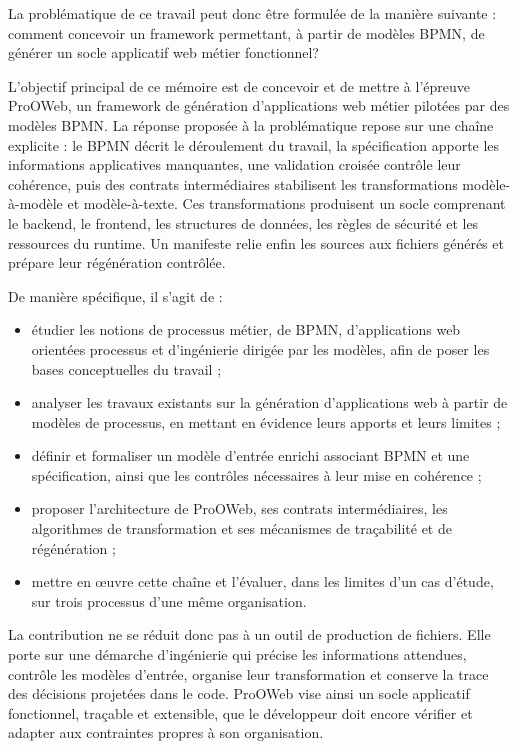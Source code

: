 La problématique de ce travail peut donc être formulée de la manière suivante : comment concevoir un framework permettant, à partir de modèles BPMN, de générer un socle applicatif web métier fonctionnel?

L'objectif principal de ce mémoire est de concevoir et de mettre à l'épreuve ProOWeb, un framework de génération d'applications web métier pilotées par des modèles BPMN. La réponse proposée à la problématique repose sur une chaîne explicite : le BPMN décrit le déroulement du travail, la spécification apporte les informations applicatives manquantes, une validation croisée contrôle leur cohérence, puis des contrats intermédiaires stabilisent les transformations modèle-à-modèle et modèle-à-texte. Ces transformations produisent un socle comprenant le backend, le frontend, les structures de données, les règles de sécurité et les ressources du runtime. Un manifeste relie enfin les sources aux fichiers générés et prépare leur régénération contrôlée.

De manière spécifique, il s'agit de :
\begin{itemize}
    \item étudier les notions de processus métier, de BPMN, d'applications web orientées processus et d'ingénierie dirigée par les modèles, afin de poser les bases conceptuelles du travail ;
    \item analyser les travaux existants sur la génération d'applications web à partir de modèles de processus, en mettant en évidence leurs apports et leurs limites ;
    \item définir et formaliser un modèle d'entrée enrichi associant BPMN et une spécification, ainsi que les contrôles nécessaires à leur mise en cohérence ;
    \item proposer l'architecture de ProOWeb, ses contrats intermédiaires, les algorithmes de transformation et ses mécanismes de traçabilité et de régénération ;
    \item mettre en œuvre cette chaîne et l'évaluer, dans les limites d'un cas d'étude, sur trois processus d'une même organisation.
\end{itemize}

La contribution ne se réduit donc pas à un outil de production de fichiers. Elle porte sur une démarche d'ingénierie qui précise les informations attendues, contrôle les modèles d'entrée, organise leur transformation et conserve la trace des décisions projetées dans le code. ProOWeb vise ainsi un socle applicatif fonctionnel, traçable et extensible, que le développeur doit encore vérifier et adapter aux contraintes propres à son organisation.

